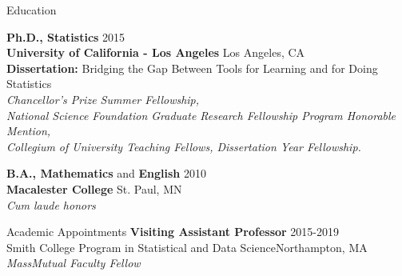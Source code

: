 \documentclass{resume} %
\begin{document}

\begin{rSection}{Education}

{\bf Ph.D., Statistics} \hfill 2015\\ 
{\bf University of California - Los Angeles} \hfill Los Angeles, CA \\
{\bf Dissertation:} Bridging the Gap Between Tools for Learning and for Doing Statistics \\
\emph{Chancellor's Prize Summer Fellowship, \\ National Science Foundation Graduate Research Fellowship Program Honorable Mention, \\ Collegium of University Teaching Fellows, Dissertation Year Fellowship.}

{\bf B.A., Mathematics} and {\bf English}  \hfill  2010 \\
{\bf Macalester College} \hfill St. Paul, MN \\ 
\emph{Cum laude honors}


\end{rSection}


\begin{rSection}{Academic Appointments}
{\bf Visiting Assistant Professor} \hfill {2015-2019} \\
{Smith College Program in Statistical and Data Science}\hfill {Northampton, MA} \\
\emph{MassMutual Faculty Fellow} \\

\end{rSection}
\end{document}
